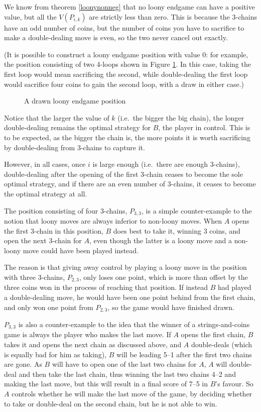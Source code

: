 \documentclass[a4paper,twocolumn]{article}
\begin{document}
We know from theorem \ref{loonynonneg} that no loony endgame can have
a positive value, but all the $V(P_{i,k})$ are strictly less than
zero. This is because the 3-chains have an odd number of coins, but
the number of coins you have to sacrifice to make a double-dealing
move is even, so the two never cancel out exactly.

(It is possible to construct a loony endgame position with value 0:
for example, the position consisting of two 4-loops shown in Figure
\ref{drawnloony}. In this case, taking the first loop would mean
sacrificing the second, while double-dealing the first loop would
sacrifice four coins to gain the second loop, with a draw in either
case.)

\begin{figure}
  \centering
  \def\svgscale{0.7}
  
  \caption{A drawn loony endgame position}
  \label{drawnloony}
\end{figure}

Notice that the larger the value of $k$ (i.e.\ the bigger the big
chain), the longer double-dealing remains the optimal strategy for
$B$, the player in control. This is to be expected, as the bigger the
chain is, the more points it is worth sacrificing by double-dealing
from 3-chains to capture it.

However, in all cases, once $i$ is large enough (i.e.\ there are enough
3-chains), double-dealing after the opening of the first 3-chain
ceases to become the sole optimal strategy, and if there are an even
number of 3-chains, it ceases to become the optimal strategy at all.

The position consisting of four 3-chains, $P_{3,3}$, is a simple
counter-example to the notion that loony moves are always inferior to
non-loony moves. When $A$ opens the first 3-chain in this position,
$B$ does best to take it, winning 3 coins, and open the next 3-chain
for $A$, even though the latter is a loony move and a non-loony move
could have been played instead.

The reason is that giving away control by playing a loony move in the
position with three 3-chains, $P_{2,3}$, only loses one point, which
is more than offset by the three coins won in the process of reaching
that position. If instead $B$ had played a double-dealing move, he
would have been one point behind from the first chain, and only won
one point from $P_{2,3}$, so the game would have finished drawn.

$P_{3,3}$ is also a counter-example to the idea that the winner of a
strings-and-coins game is always the player who makes the last
move. If $A$ opens the first chain, $B$ takes it and opens the next
chain as discussed above, and $A$ double-deals (which is equally bad
for him as taking), $B$ will be leading 5--1 after the first two
chains are gone. As $B$ will have to open one of the last two chains
for $A$, $A$ will double-deal and then take the last chain, thus
winning the last two chains 4--2 and making the last move, but this
will result in a final score of 7--5 in $B$'s favour. So $A$ controls
whether he will make the last move of the game, by deciding whether to
take or double-deal on the second chain, but he is not able to win.
\end{document}
